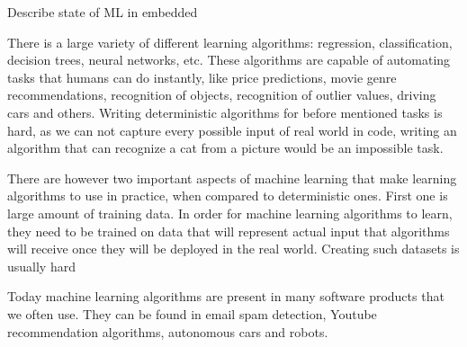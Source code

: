 Describe state of ML in embedded





There is a large variety of different learning algorithms: regression, classification, decision trees, neural networks, etc. 
These algorithms are capable of automating tasks that humans can do instantly, like price predictions, movie genre recommendations, recognition of objects, recognition of outlier values, driving cars and others.
Writing deterministic algorithms for before mentioned tasks is hard, as we can not capture every possible input of real world in code, writing an algorithm that can recognize a cat from a picture would be an impossible task.

There are however two important aspects of machine learning that make learning algorithms to use in practice, when compared to deterministic ones.
First one is large amount of training data.
In order for machine learning algorithms to learn, they need to be trained on data that will represent actual input that algorithms will receive once they will be deployed in the real world. 
Creating such datasets is usually hard






Today machine learning algorithms are present in many software products that we often use. 
They can be found in email spam detection, Youtube recommendation algorithms, autonomous cars and robots.

